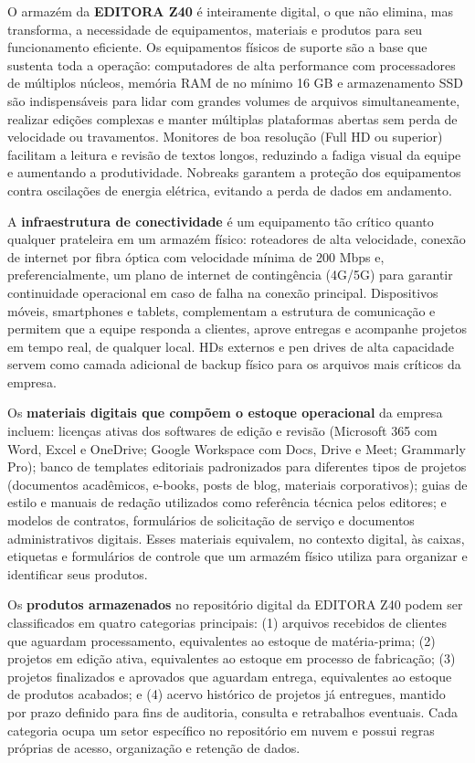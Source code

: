 \documentclass[10pt,a4paper]{article}
\begin{document}
O armazém da \textbf{EDITORA Z40} é inteiramente digital, o que não elimina, mas transforma, a necessidade de equipamentos, materiais e produtos para seu funcionamento eficiente. Os equipamentos físicos de suporte são a base que sustenta toda a operação: computadores de alta performance com processadores de múltiplos núcleos, memória RAM de no mínimo 16 GB e armazenamento SSD são indispensáveis para lidar com grandes volumes de arquivos simultaneamente, realizar edições complexas e manter múltiplas plataformas abertas sem perda de velocidade ou travamentos. Monitores de boa resolução (Full HD ou superior) facilitam a leitura e revisão de textos longos, reduzindo a fadiga visual da equipe e aumentando a produtividade. Nobreaks garantem a proteção dos equipamentos contra oscilações de energia elétrica, evitando a perda de dados em andamento.

A \textbf{infraestrutura de conectividade} é um equipamento tão crítico quanto qualquer prateleira em um armazém físico: roteadores de alta velocidade, conexão de internet por fibra óptica com velocidade mínima de 200 Mbps e, preferencialmente, um plano de internet de contingência (4G/5G) para garantir continuidade operacional em caso de falha na conexão principal. Dispositivos móveis, smartphones e tablets, complementam a estrutura de comunicação e permitem que a equipe responda a clientes, aprove entregas e acompanhe projetos em tempo real, de qualquer local. HDs externos e pen drives de alta capacidade servem como camada adicional de backup físico para os arquivos mais críticos da empresa.

Os \textbf{materiais digitais que compõem o estoque operacional} da empresa incluem: licenças ativas dos softwares de edição e revisão (Microsoft 365 com Word, Excel e OneDrive; Google Workspace com Docs, Drive e Meet; Grammarly Pro); banco de templates editoriais padronizados para diferentes tipos de projetos (documentos acadêmicos, e-books, posts de blog, materiais corporativos); guias de estilo e manuais de redação utilizados como referência técnica pelos editores; e modelos de contratos, formulários de solicitação de serviço e documentos administrativos digitais. Esses materiais equivalem, no contexto digital, às caixas, etiquetas e formulários de controle que um armazém físico utiliza para organizar e identificar seus produtos.

Os \textbf{produtos armazenados} no repositório digital da EDITORA Z40 podem ser classificados em quatro categorias principais: (1) arquivos recebidos de clientes que aguardam processamento, equivalentes ao estoque de matéria-prima; (2) projetos em edição ativa, equivalentes ao estoque em processo de fabricação; (3) projetos finalizados e aprovados que aguardam entrega, equivalentes ao estoque de produtos acabados; e (4) acervo histórico de projetos já entregues, mantido por prazo definido para fins de auditoria, consulta e retrabalhos eventuais. Cada categoria ocupa um setor específico no repositório em nuvem e possui regras próprias de acesso, organização e retenção de dados.
\end{document}
